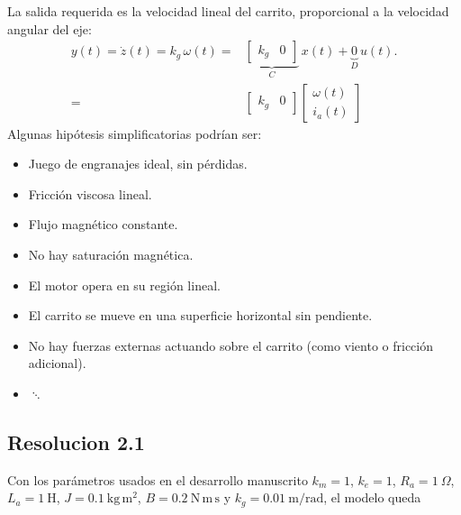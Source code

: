 \documentclass[
  11pt,
  letterpaper,
   addpoints,
   answers
  ]{exam}
\begin{document}
\begin{solution}
\begin{equation}
\end{equation}
La salida requerida es la velocidad lineal del carrito, proporcional a la velocidad angular del eje:
\begin{align}
  y(t)=\dot z(t)=k_g\,\omega(t)
  =&
  \underbrace{\begin{bmatrix}k_g & 0\end{bmatrix}}_{C}\,x(t)
  +
  \underbrace{0}_{D}\,u(t).\\
  =&\begin{bmatrix}
    k_g & 0
  \end{bmatrix}
  \begin{bmatrix}
    \omega(t)\\ i_a(t)
  \end{bmatrix}
\end{align}
Algunas hipótesis simplificatorias podrían ser:
\begin{itemize}
  \item Juego de engranajes ideal, sin pérdidas.
  \item Fricción viscosa lineal.
  \item Flujo magnético constante.
  \item No hay saturación magnética.
  \item El motor opera en su región lineal.
  \item El carrito se mueve en una superficie horizontal sin pendiente.
  \item No hay fuerzas externas actuando sobre el carrito (como viento o fricción adicional).
  \item $\ddots$
\end{itemize}
\subsection*{Resolucion 2.1}

Con los parámetros usados en el desarrollo manuscrito
$k_m=1$, $k_e=1$, $R_a=1~\Omega$, $L_a=1~\mathrm{H}$, $J=0.1~\mathrm{kg\,m^2}$,
$B=0.2~\mathrm{N\,m\,s}$ y $k_g=0.01~\mathrm{m/rad}$, el modelo queda


\end{solution}
\end{document}

